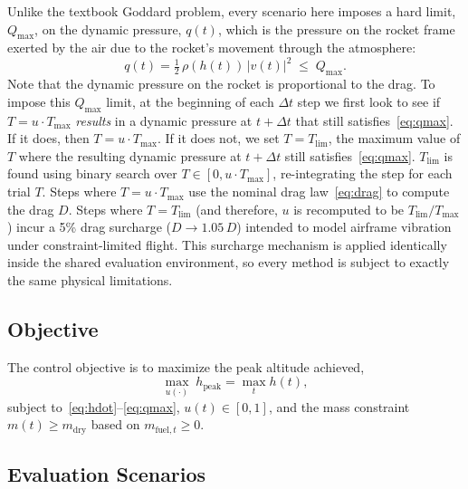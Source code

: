 \documentclass[mnsc,sglanonrev]{informs4}
\begin{document}
Unlike the textbook Goddard problem, every scenario here imposes a hard limit, $Q_{\max}$, on the dynamic pressure, $q(t)$, which is the pressure on the rocket frame exerted by the air due to the rocket's movement through the atmosphere:
\begin{equation}
  q(t) = \tfrac{1}{2}\,\rho(h(t))\, |v(t)|^2 \;\le\; Q_{\max}.
  \label{eq:qmax}
\end{equation}
Note that the dynamic pressure on the rocket is proportional to the drag. To impose this $Q_{\max}$ limit, at the beginning of each $\Delta t$ step we first look to see if $T=u\cdot T_{\max}$ \emph{results} in a dynamic pressure at $t+\Delta t$ that still satisfies~\eqref{eq:qmax}. If it does, then $T=u\cdot T_{\max}$. If it does not, we set $T=T_{\lim}$, the maximum value of $T$ where the resulting dynamic pressure at $t+\Delta t$ still satisfies~\eqref{eq:qmax}. $T_{\lim}$ is found using binary search over $T \in [0, u\cdot T_{\max}]$, re-integrating the step for each trial $T$. Steps where $T=u\cdot T_{\max}$ use the nominal drag law~\eqref{eq:drag} to compute the drag $D$. Steps where $T=T_{\lim}$ (and therefore, $u$ is recomputed to be $T_{\lim}/T_{\max}$) incur a 5\% drag surcharge
($D \to 1.05\,D$) intended to model airframe vibration under constraint-limited flight. This surcharge mechanism is applied identically inside the shared evaluation environment, so every method is subject to exactly the same physical limitations.

\subsection{Objective}
\label{sec:god_objective}

The control objective is to maximize the peak altitude achieved,
\begin{equation}
  \max_{u(\cdot)} \; h_{\mathrm{peak}} = \max_{t} h(t),
  \label{eq:objective}
\end{equation}
subject to~\eqref{eq:hdot}--\eqref{eq:qmax}, $u(t)\in[0,1]$, and the mass constraint $m(t)\ge m_{\mathrm{dry}}$ based on $m_{\textrm{fuel},t}\geq 0$. 

\subsection{Evaluation Scenarios}
\label{sec:god_examples}
\end{document}
